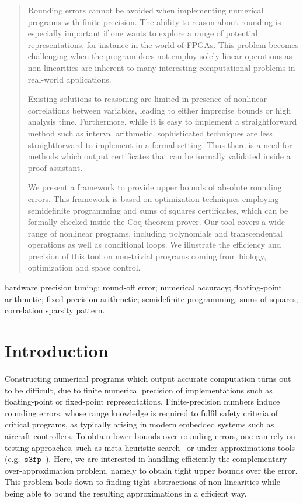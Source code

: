 \documentclass[preprint]{sigplanconf}
\newcommand{\sthreefp}{\mathtt{s3fp}}
\theoremstyle{plain}
\begin{document}
\begin{abstract}

Rounding errors cannot be avoided when implementing numerical programs with finite precision.         
The ability to reason about rounding is especially important if one wants to explore a range of potential representations, for instance in the world of FPGAs. This problem becomes challenging when the program does not employ solely linear operations as non-linearities are inherent to many interesting computational problems in real-world applications. 

Existing solutions to reasoning are limited in presence of nonlinear correlations between variables, leading to either imprecise bounds or high analysis time. Furthermore, while it is easy to implement a straightforward method such as interval arithmetic, sophisticated techniques are less straightforward to implement in a formal setting. Thus there is a need for methods which output certificates that can be formally  validated inside a proof assistant.

We present a framework to provide upper bounds of absolute rounding errors. This framework is based on optimization techniques employing  semidefinite programming and sums of squares certificates, which can be formally checked inside the Coq theorem prover.
Our tool covers a wide range of nonlinear programs, including polynomials and transcendental operations as well as conditional loops.                                                             We illustrate the efficiency and  precision of this tool on non-trivial programs coming from biology, optimization and space control.
\end{abstract}



\keywords
hardware precision tuning; round-off error; numerical accuracy; floating-point arithmetic; fixed-precision arithmetic; semidefinite programming; sums of squares; correlation sparsity pattern.
\section{Introduction} %
\label{sec:intro}
%
Constructing numerical programs which output accurate computation turns out to be difficult, due to finite numerical precision of implementations such as floating-point or fixed-point representations. Finite-precision numbers induce rounding errors, whose range knowledge is required to fulfil safety criteria of critical programs, as typically arising in modern embedded systems such as aircraft controllers.
To obtain lower bounds over rounding errors, one can rely on testing approaches, such as meta-heuristic search~\cite{Borges12Test} or under-approximations tools (e.g.~$\sthreefp$~\cite{Chiang14s3fp}). Here, we are interested in handling efficiently the complementary over-approximation problem, namely to obtain tight upper bounds over the error. This problem boils down to finding tight abstractions of non-linearities while being able to bound the resulting approximations in a efficient way.  
%
\end{document}
